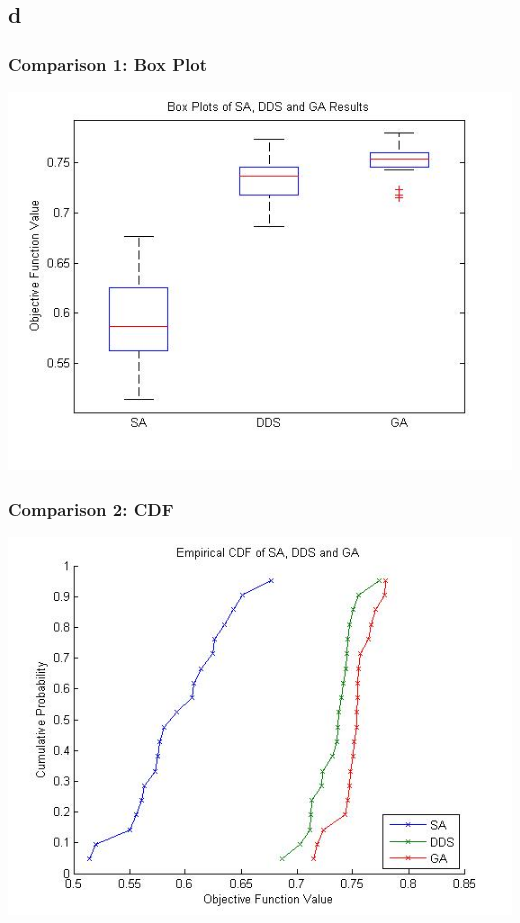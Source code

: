 \documentclass[12pt]{article}
\begin{document}
\subsection{d}

\subsubsection{Comparison 1: Box Plot}
\includegraphics[scale=0.6]{boxplot}\\
\subsubsection{Comparison 2: CDF}
\includegraphics[scale=0.6]{cdf}\\
\end{document}
